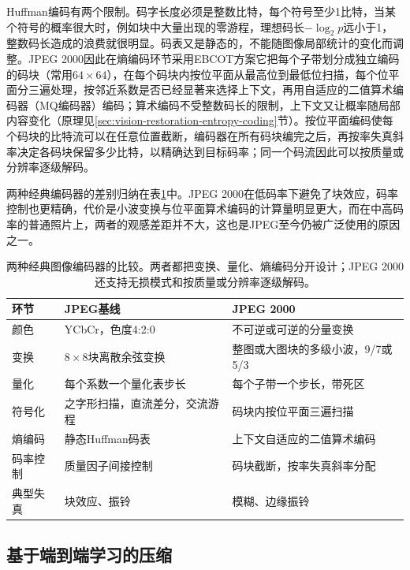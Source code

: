 Huffman编码有两个限制。码字长度必须是整数比特，每个符号至少1比特，当某个符号的概率很大时，例如块中大量出现的零游程，理想码长$-\log_2p$远小于1，整数码长造成的浪费就很明显。码表又是静态的，不能随图像局部统计的变化而调整。JPEG 2000因此在熵编码环节采用EBCOT方案它把每个子带划分成独立编码的码块（常用$64\times64$），在每个码块内按位平面从最高位到最低位扫描，每个位平面分三遍处理，按邻近系数是否已经显著来选择上下文，再用自适应的二值算术编码器（MQ编码器）编码；算术编码不受整数码长的限制，上下文又让概率随局部内容变化（原理见\ref{sec:vision-restoration-entropy-coding}节）。按位平面编码使每个码块的比特流可以在任意位置截断，编码器在所有码块编完之后，再按率失真斜率决定各码块保留多少比特，以精确达到目标码率；同一个码流因此可以按质量或分辨率逐级解码。

两种经典编码器的差别归纳在表\ref{tab:vision-classic-codec-compare}中。JPEG 2000在低码率下避免了块效应，码率控制也更精确，代价是小波变换与位平面算术编码的计算量明显更大，而在中高码率的普通照片上，两者的观感差距并不大，这也是JPEG至今仍被广泛使用的原因之一。

\begin{table}[htbp]
 \centering
 \small
 \begin{tabularx}{\linewidth}{@{}p{14mm}XX@{}}
  \toprule
  环节 & JPEG基线 & JPEG 2000\\
  \midrule
  颜色 & YCbCr，色度4:2:0 & 不可逆或可逆的分量变换\\
  变换 & $8\times8$块离散余弦变换 & 整图或大图块的多级小波，9/7或5/3\\
  量化 & 每个系数一个量化表步长 & 每个子带一个步长，带死区\\
  符号化 & 之字形扫描，直流差分，交流游程 & 码块内按位平面三遍扫描\\
  熵编码 & 静态Huffman码表 & 上下文自适应的二值算术编码\\
  码率控制 & 质量因子间接控制 & 码块截断，按率失真斜率分配\\
  典型失真 & 块效应、振铃 & 模糊、边缘振铃\\
  \bottomrule
 \end{tabularx}
 \caption{两种经典图像编码器的比较。两者都把变换、量化、熵编码分开设计；JPEG 2000还支持无损模式和按质量或分辨率逐级解码。}
 \label{tab:vision-classic-codec-compare}
\end{table}

\subsection{基于端到端学习的压缩}
\label{sec:vision-restoration-learned-codec}

